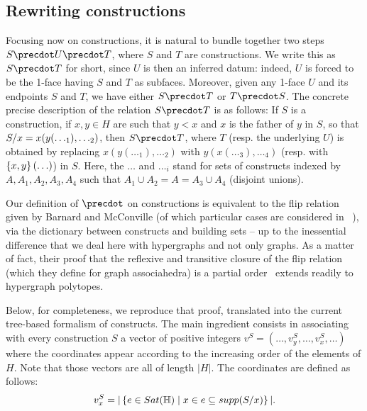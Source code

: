 



\subsection{Rewriting constructions}


Focusing now on constructions, it is natural to bundle together two steps
$S\precdot U\precdot T$, where $S$ and $T$ are constructions.  We write this as $S\precdot T$ for short, since $U$ is then an inferred datum: indeed, $U$ is forced to be the 1-face having $S$ and $T$ as subfaces. 
Moreover, given any 1-face $U$ and its  endpoints $S$ and $T$,  we have either $S\precdot T$ or $T\precdot S$.
The concrete precise description of the relation $S\precdot T$ is as follows:  If $S$ is a construction, if $x,y\in H$
are such that $y<x$ and $x$ is the father of $y$ in $S$, so that $S/x=x(y(\ldots_1),\ldots_2)$, then $S\precdot T$, where $T$  (resp. the underlying $U$) is obtained by replacing $x(y(\ldots_1),\ldots_2)$ with $y(x(\ldots_3),\ldots_4)$ (resp. with $\left\{x,y\right\}(\ldots)$) in $S$.
Here, the $\ldots$  and $\ldots_i$ stand for sets of constructs indexed by $A,A_1,A_2,A_3,A_4$ such that
$A_1\cup A_2 = A =A_3\cup A_4$ (disjoint unions). 

Our definition of $\precdot$ on constructions is equivalent to the flip relation given by  Barnard and McConville (of which particular cases are considered in ~\cite{Forcey-Tamari}), via the dictionary between constructs and building sets -- up to the inessential difference that we deal here with hypergraphs and not only graphs.
As a matter of fact, their proof that the  reflexive and transitive closure of the flip relation (which they define for graph associahedra) is a partial order~\cite[Lemma 2.8]{Barnard-McConville} extends readily to  hypergraph polytopes.

Below, for completeness, we reproduce that proof, translated  into the current tree-based formalism of constructs. 
The main ingredient consists in associating with every construction $S$ a vector of positive integers $v^S=(\ldots,v^S_y,\ldots,v^S_x,\ldots)$ where the coordinates appear according to the increasing order of the elements of $H$. Note that those vectors are all of length $|H|$.
The coordinates are defined as follows: 
$$v^S_x=|\left\{e\in{Sat}({\mathbb H}) \mid x\in e\subseteq {supp}(S/x)\right\}|.$$

